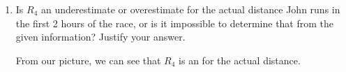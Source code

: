\documentclass{article}
\begin{document}
\begin{enumerate}
\begin{enumerate}
  \item
    \begin{problem}[\vfill\newpage]
      Is $R_4$ an underestimate or overestimate for the actual distance
      John runs in the first 2 hours of the race, or is it impossible to
      determine that from the given information?  Justify your answer. 
    \end{problem}

    \begin{solution}
      From our picture, we can see that $R_4$ is an 
      for the actual distance. 
    \end{solution}

  \end{enumerate}



\end{enumerate}
\end{document}
